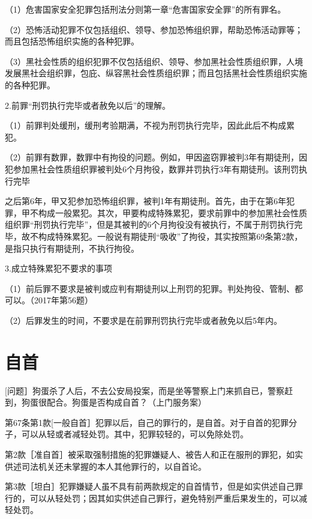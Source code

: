 （1）危害国家安全犯罪包括刑法分则第一章“危害国家安全罪”的所有罪名。

（2）恐怖活动犯罪不仅包括组织、领导、参加恐怖组织罪，帮助恐怖活动罪等；而且包括恐怖组织实施的各种犯罪。

（3）黑社会性质的组织犯罪不仅包括组织、领导、参加黑社会性质组织罪，人境发展黑社会组织罪，包庇、纵容黑社会性质组织罪；而且包括黑社会性质组织实施的各种犯罪。

2.前罪“刑罚执行完毕或者赦免以后”的理解。

（1）前罪判处缓刑，缓刑考验期满，不视为刑罚执行完毕，因此此后不构成累犯。

（2）前罪有数罪，数罪中有拘役的问题。例如，甲因盗窃罪被判3年有期徒刑，因犯参加黑社会性质组织罪被判处6个月拘役，数罪并罚执行3年有期徒刑。该刑罚执行完毕

之后第6年，甲又犯参加恐怖组织罪，被判1年有期徒刑。首先，由于在第6年犯罪，甲不构成一般累犯。其次，甲要构成特殊累犯，要求前罪中的参加黑社会性质组织罪“刑罚执行完毕”，但是其被判的6个月拘役没有被执行，不属于刑罚执行完毕，故不构成特殊累犯。一般说有期徒刑“吸收”了拘役，其实按照第69条第2款，是指只执行有期徒刑，不执行拘役。

3.成立特殊累犯不要求的事项

（1）前后罪不要求是被判或应判有期徒刑以上刑罚的犯罪。判处拘役、管制、都可以。（2017年第56题）

（2）后罪发生的时间，不要求是在前罪刑罚执行完毕或者赦免以后5年内。


\section{自首}

[问题］狗蛋杀了人后，不去公安局投案，而是坐等警察上门来抓自已，警察赶到，狗蛋很配合。狗蛋是否构成自首？（上门服务案）

第67条第1款[一般自首］犯罪以后，自己的罪行的，是自首。对于自首的犯罪分子，可以从轻或者减轻处罚。其中，犯罪较轻的，可以免除处罚。

第2款［准自首］被采取强制措施的犯罪嫌疑人、被告人和正在服刑的罪犯，如实供述司法机关还未掌握的本人其他罪行的，以自首论。

第3款［坦白］犯罪嫌疑人虽不具有前两款规定的自首情节，但是如实供述自己罪行的，可以从轻处罚；因其如实供述自己罪行，避免特别严重后果发生的，可以减轻处罚。

